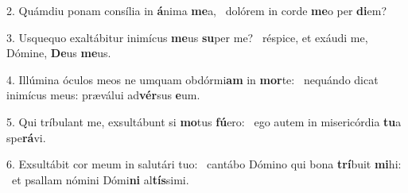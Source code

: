 2. Quámdiu ponam consília in \textbf{á}nima \textbf{me}a, \ast\  dolórem in corde \textbf{me}o per \textbf{di}em?\

3. Usquequo exaltábitur inimícus \textbf{me}us \textbf{su}per me? \ast\  réspice, et exáudi me, Dómine, \textbf{De}us \textbf{me}us.\

4. Illúmina óculos meos ne umquam obdórmi\textbf{am} in \textbf{mor}te: \ast\  nequándo dicat inimícus meus: præválui ad\textbf{vér}sus \textbf{e}um.\

5. Qui tríbulant me, exsultábunt si \textbf{mo}tus \textbf{fú}ero: \ast\  ego autem in misericórdia \textbf{tu}a spe\textbf{rá}vi.\

6. Exsultábit cor meum in salutári tuo: \dag\  cantábo Dómino qui bona \textbf{trí}buit \textbf{mi}hi: \ast\  et psallam nómini Dómi\textbf{ni} al\textbf{tís}simi.\

